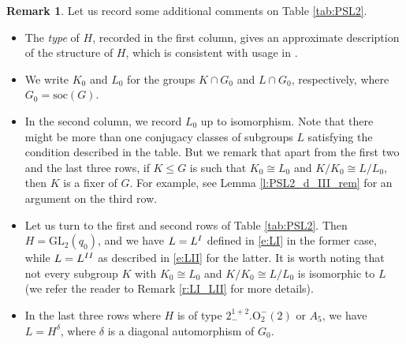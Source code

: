 \documentclass[twoside,a4paper,reqno,11pt]{amsart}
\newcommand{\<}{\langle}
\renewcommand{\>}{\rangle}
\newcommand{\leqs}{\leqslant}
\newcommand{\soc}{\mathrm{soc}}
\newcommand{\GL}{\mathrm{GL}}
\theoremstyle{definition}
\newtheorem{rem}[thm]{Remark}
\begin{document}
	\begin{rem}
		\label{r:tab:PSL2}
		Let us record some additional comments on Table \ref{tab:PSL2}.
		\begin{itemize}\addtolength{\itemsep}{0.2\baselineskip}
			\item[{\rm (i)}] The \textit{type} of $H$, recorded in the first column, gives an  approximate description of the structure of $H$, which is consistent with usage in \cite{KL_classical}.
			\item[{\rm (ii)}] We write $K_0$ and $L_0$ for the groups $K\cap G_0$ and $L\cap G_0$, respectively, where $G_0 = \soc(G)$.
			\item[{\rm (iii)}] In the second column, we record $L_0$ up to isomorphism. Note that there might be more than one conjugacy classes of subgroups $L$ satisfying the condition described in the table. But we remark that apart from the first two and the last three rows, if $K\leqs G$ is such that $K_0\cong L_0$ and $K/K_0\cong L/L_0$, then $K$ is a fixer of $G$. For example, see Lemma \ref{l:PSL2_d_III_rem} for an argument on the third row.
			\item[{\rm (iv)}] Let us turn to the first and second rows of Table \ref{tab:PSL2}. Then $H = \GL_2(q_0)$, and we have $L = L^{\rm I}$ defined in \eqref{e:LI} in the former case, while $L = L^{\rm II}$ as described in \eqref{e:LII} for the latter. It is worth noting that not every subgroup $K$ with $K_0\cong L_0$ and $K/K_0\cong L/L_0$ is isomorphic to $L$ (we refer the reader to Remark \ref{r:LI_LII} for more details).
			\item[{\rm (v)}] In the last three rows where $H$ is of type $2^{1+2}_-.\mathrm{O}_2^-(2)$ or $A_5$, we have $L = H^\delta$, where $\delta$ is a diagonal automorphism of $G_0$.
		\end{itemize}
	\end{rem}
	
\end{document}
